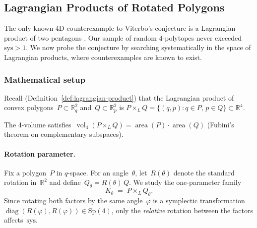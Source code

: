 %
%
%

\subsection{Lagrangian Products of Rotated Polygons}
\label{sec:lagrangian-products}

The only known 4D counterexample to Viterbo's conjecture is a Lagrangian
product of two pentagons \cite{HaimKislevOstrover2024}.
Our sample of random 4-polytopes never exceeded~$\mathrm{sys} > 1$. 
We now probe the conjecture by searching systematically in the space of Lagrangian products, where counterexamples are known to exist.

\subsubsection*{Mathematical setup}

Recall (Definition~\ref{def:lagrangian-product}) that the Lagrangian product
of convex polygons~$P \subset \mathbb{R}^2_q$ and~$Q \subset \mathbb{R}^2_p$
is $P \times_L Q = \{(q,p) : q \in P,\, p \in Q\} \subset \mathbb{R}^4$.

The 4-volume satisfies~$\operatorname{vol}_4(P \times_L Q)
= \operatorname{area}(P) \cdot \operatorname{area}(Q)$ (Fubini's theorem on
complementary subspaces).

\paragraph{Rotation parameter.}
Fix a polygon~$P$ in $q$-space. For an angle~$\theta$, let~$R(\theta)$ denote
the standard rotation in~$\mathbb{R}^2$ and
define~$Q_\theta = R(\theta)\,Q$. We study the one-parameter family
\[
  K_\theta \;=\; P \times_L Q_\theta.
\]
Since rotating both factors by the same angle~$\varphi$ is a symplectic
transformation~$\operatorname{diag}(R(\varphi), R(\varphi)) \in \mathrm{Sp}(4)$,
only the \emph{relative} rotation between the factors affects~$\mathrm{sys}$.

